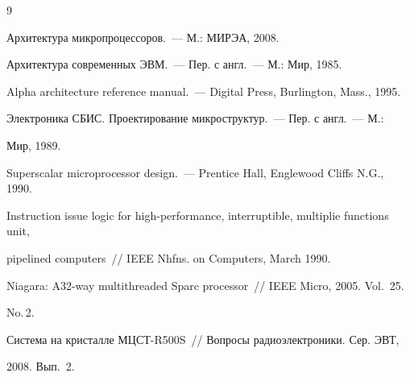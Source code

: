 {\small\frenchspacing


{%




\begin{thebibliography}{9}


          






Архитектура микропроцессоров.~--- М.: МИРЭА, 2008.









Архитектура современных ЭВМ.~--- Пер. с англ.~--- М.: Мир, 1985.









Alpha architecture reference manual.~--- Digital Press, Burlington, Mass., 1995.







Электроника СБИС. Проектирование микроструктур.~--- Пер. с англ.~--- М.: 


Мир, 1989.









Superscalar microprocessor design.~--- Prentice Hall, Englewood Cliffs N.G., 1990.









Instruction issue logic for high-performance, interruptible, multiplie functions unit, 


pipelined computers~/\!\!/ IEEE Nhfns. on Computers, March 1990.









Niagara: A32-way multithreaded Sparc processor~/\!\!/ IEEE Micro, 2005. Vol.~25. 


No.\,2.





\label{end\stat}









Система на кристалле МЦСТ-R500S~/\!\!/ Вопросы радиоэлектроники. Сер. ЭВТ, 


2008. Вып.~2.


 \end{thebibliography}


}


}


